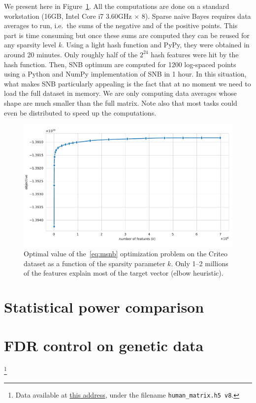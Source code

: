 We present here in Figure~\ref{fig:criteo_hash_elbow}.
All the computations are done on a standard workstation (16GB, Intel Core i7 3.60GHz $\times$ 8).
Sparse naive Bayes requires data averages to run,
i.e.\ the sums of the negative and of the positive points.
This part is time consuming but once these sums are computed they can be reused for any sparsity level $k$.
Using a light hash function and PyPy, they were obtained in around 20 minutes.
Only roughly half of the $2^{24}$ hash features were hit by the hash function.
Then, SNB optimum are computed for 1200 log-spaced points using a Python and NumPy implementation of SNB in 1 hour.
In this situation, what makes SNB particularly appealing is the fact that at no moment we need to load the full dataset
in memory.
We are only computing data averages whose shape are much smaller than the full matrix.
Note also that most tasks could even be distributed to speed up the computations.
\begin{figure}
    \centering
    \includegraphics[width=0.75\linewidth, height=0.4\linewidth]{figures/criteo_hash_elbow.pdf}
    \caption{
        Optimal value of the~\ref{eq:msnb} optimization problem on the Criteo dataset
        as a function of the sparsity parameter $k$.
        Only 1--2 millions of the features explain most of the target vector (elbow heuristic).
    }
    \label{fig:criteo_hash_elbow}
\end{figure}

\section{Statistical power comparison}\label{sec:power_comparison}

\section{FDR control on genetic data}\label{sec:genetic_data}

\footnote{
    Data available at \href{https://amp.pharm.mssm.edu/archs4/download.html}{this address},
    under the filename \texttt{human\_matrix.h5 v8}.
}

